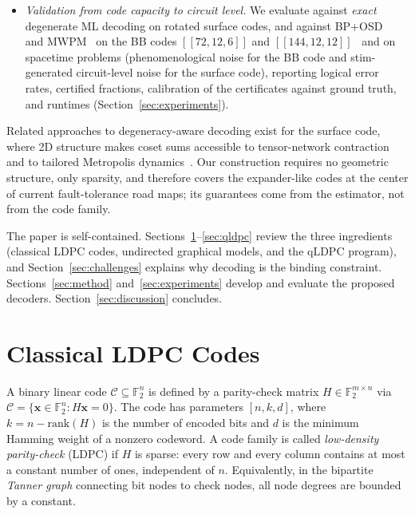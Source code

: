 \documentclass[a4paper,11pt]{quantumarticle}
\theoremstyle{definition}
\newcommand{\F}{\mathbb{F}}
\newcommand{\vx}{\boldsymbol{x}}
\begin{document}
\begin{itemize}
induced width $\approx23$, so \emph{exact degenerate ML decoding of a
qLDPC code} becomes feasible, and bounded clusters yield upper bounds
that, paired with configuration lower bounds, give \emph{deterministic}
optimality certificates and provable class pruning
(Section~\ref{sec:regions}).
\item \emph{Validation from code capacity to circuit level.} We evaluate
against \emph{exact} degenerate ML decoding on rotated surface codes, and
against BP+OSD~\cite{panteleev2021bposd, roffe2020} and
MWPM~\cite{higgott2022} on the BB codes $[\![72,12,6]\!]$ and
$[\![144,12,12]\!]$~\cite{bravyi2024} and on spacetime problems
(phenomenological noise for the BB code and stim-generated circuit-level
noise for the surface code), reporting logical error rates, certified
fractions, calibration of the certificates against ground truth, and
runtimes (Section~\ref{sec:experiments}).
\end{itemize}

Related approaches to degeneracy-aware decoding exist for the surface code,
where 2D structure makes coset sums accessible to tensor-network
contraction~\cite{bravyi2014ml} and to tailored Metropolis
dynamics~\cite{hutter2014}. Our construction requires no geometric
structure, only sparsity, and therefore covers the expander-like codes at
the center of current fault-tolerance road maps; its guarantees come from
the estimator, not from the code family.

The paper is self-contained. Sections~\ref{sec:classical}--\ref{sec:qldpc}
review the three ingredients (classical LDPC codes, undirected graphical
models, and the qLDPC program), and Section~\ref{sec:challenges} explains
why decoding is the binding constraint. Sections~\ref{sec:method}
and~\ref{sec:experiments} develop and evaluate the proposed decoders.
Section~\ref{sec:discussion} concludes.

\section{Classical LDPC Codes}
\label{sec:classical}
A binary linear code $\mathcal{C} \subseteq \F_2^n$ is defined by a
parity-check matrix $H \in \F_2^{m \times n}$ via
$\mathcal{C} = \{ \vx \in \F_2^n : H\vx = 0 \}$. The code has parameters
$[n, k, d]$, where $k = n - \mathrm{rank}(H)$ is the number of encoded bits
and $d$ is the minimum Hamming weight of a nonzero codeword. A code family is
called \emph{low-density parity-check} (LDPC) if $H$ is sparse: every row and
every column contains at most a constant number of ones, independent of $n$.
Equivalently, in the bipartite \emph{Tanner graph} connecting bit nodes to
check nodes, all node degrees are bounded by a constant.
\end{document}

